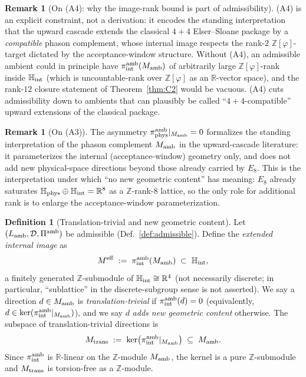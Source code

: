 \documentclass[11pt, a4paper]{amsart}
\theoremstyle{definition}
\newtheorem{definition}[theorem]{Definition}
\newtheorem{remark}[theorem]{Remark}
\newcommand{\R}{\mathbb{R}}
\newcommand{\Z}{\mathbb{Z}}
\newcommand{\HH}{\mathbb{H}}
\newcommand{\Ophi}{\mathbb{Z}[\varphi]}
\begin{document}
\begin{remark}[On (A4): why the image-rank bound is part of
  admissibility]
\label{rmk:A4-justification}
(A4) is an explicit constraint, not a derivation: it
encodes the standing interpretation that the upward cascade
extends the classical $4 + 4$ Elser--Sloane package by a
\emph{compatible} phason complement, whose internal image
respects the rank-$2$ $\Ophi$-target dictated by the
acceptance-window structure. Without (A4), an admissible
ambient could in principle have $\pi_{\rm int}^{\rm
amb}(M_{\rm amb})$ of arbitrarily large $\Ophi$-rank inside
$\HH_{\rm int}$ (which is uncountable-rank over $\Ophi$ as
an $\R$-vector space), and the rank-$12$ closure statement
of Theorem~\ref{thm:C2} would be vacuous. (A4) cuts
admissibility down to ambients that can plausibly be
called ``$4 + 4$-compatible'' upward extensions of the
classical package.
\end{remark}

\begin{remark}[On (A3)]
The asymmetry $\pi_{\rm phys}^{\rm amb}|_{M_{\rm amb}} = 0$
formalizes the standing interpretation of the phason
complement $M_{\rm amb}$ in the upward-cascade literature: it
parameterizes the internal (acceptance-window) geometry only,
and does not add new physical-space directions beyond those
already carried by $E_8$. This is the interpretation under
which ``no new geometric content'' has meaning: $E_8$ already
saturates $\HH_{\rm phys} \oplus \HH_{\rm int} = \R^8$ as a
$\Z$-rank-8 lattice, so the only role for additional rank is
to enlarge the acceptance-window parameterization.
\end{remark}

\begin{definition}[Translation-trivial and new geometric content]
\label{def:no-new}
Let $(L_{\rm amb}, \mathcal{D}, \Pi^{\rm amb})$ be admissible
(Def.~\ref{def:admissible}). Define the \emph{extended
internal image} as
\[
  M^{\rm eff} \;:=\; \pi_{\rm int}^{\rm amb}(M_{\rm amb})
    \;\subset\; \HH_{\rm int},
\]
a finitely generated $\Z$-submodule of $\HH_{\rm int} \cong
\R^4$ (not necessarily discrete; in particular, ``sublattice''
in the discrete-subgroup sense is not asserted). We say a
direction $d \in M_{\rm amb}$ is \emph{translation-trivial}
if $\pi_{\rm int}^{\rm amb}(d) = 0$ (equivalently, $d \in
\ker(\pi_{\rm int}^{\rm amb}|_{M_{\rm amb}})$), and we say $d$
\emph{adds new geometric content} otherwise. The subspace of
translation-trivial directions is
\[
  M_{\rm trans} \;:=\; \ker\bigl(\pi_{\rm int}^{\rm amb}
    |_{M_{\rm amb}}\bigr)
    \;\subseteq\; M_{\rm amb}.
\]
Since $\pi_{\rm int}^{\rm amb}$ is $\R$-linear on the
$\Z$-module $M_{\rm amb}$, the kernel is a pure $\Z$-submodule
and $M_{\rm trans}$ is torsion-free as a $\Z$-module.
\end{definition}
\end{document}
